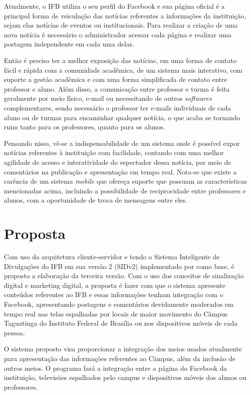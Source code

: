 Atualmente, o IFB utiliza o seu perfil do Facebook e sua página oficial é a principal forma de veiculação das notícias referentes a informações da instituição, sejam elas notícias de eventos ou institucionais. Para realizar a criação de uma nova notícia é necessário o administrador acessar cada página e realizar uma postagem independente em cada uma delas. 

Então é preciso ter a melhor exposição das notícias, em uma forma de contato fácil e rápida com a comunidade acadêmica, de um sistema mais interativo, com suporte a gestão acadêmica e com uma forma simplificada de contato entre professor e aluno. Além disso, a comunicação entre professor e turma é feita geralmente por meio físico, e-mail ou necessitando de outros \textit{softwares} complementares, sendo necessário o professor ter e-mails individuais de cada aluno ou de turmas para encaminhar qualquer notícia, o que acaba se tornando ruim tanto para os professores, quanto para os alunos. 

Pensando nisso, vê-se a indispensabilidade de um sistema onde é possível expor notícias referentes à instituição com facilidade, contando com uma melhor agilidade de acesso e interatividade do espectador dessa notícia, por meio de comentários na publicação e apresentação em tempo real. Nota-se que existe a carência de um sistema \textit{mobile} que ofereça suporte que possuam as características mencionadas acima, incluindo a possibilidade de reciprocidade entre professores e alunos, com a oportunidade  de troca de mensagens entre eles.

\section{Proposta}
Com uso da arquitetura cliente-servidor e tendo o  Sistema Inteligente de Divulgações do IFB em sua versão 2 (SIDv2) implementado por \cite{sobrinho2017} como base, é proposto a elaboração da terceira versão. Com o uso dos conceitos de sinalização digital e marketing digital, a proposta é fazer com que o sistema apresente conteúdos referentes ao IFB e essas informações tenham integração com o Facebook, apresentando postagens e comentários devidamente moderados em tempo real nas telas espalhadas por locais de maior movimento do Câmpus Taguatinga do Instituto Federal de Brasília ou nos dispositivos móveis de cada pessoa. 

O sistema proposto visa proporcionar a integração dos meios usados atualmente para apresentação das informações referentes ao Câmpus, além da inclusão de outros meios. O programa fará a integração entre a página do Facebook da instituição, televisões espalhados pelo campus e dispositivos móveis dos alunos ou professores.

